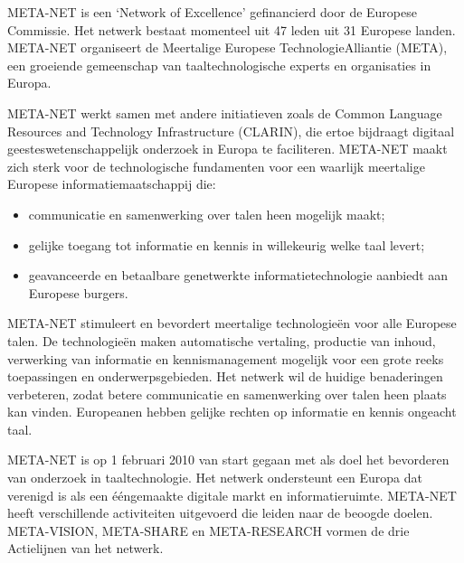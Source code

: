 \documentclass[]{../../metanetpaper}
\begin{document}
\begin{multicols}{2}

    META-NET is een `Network of Excellence' gefinancierd door de Europese Commissie. Het netwerk bestaat momenteel uit 47 leden uit 31 Europese landen. META-NET organiseert de Meertalige Europese TechnologieAlliantie (META), een groeiende gemeenschap van taaltechnologische experts en organisaties in Europa.

    META-NET werkt samen met andere initiatieven zoals de Common Language Resources and Technology Infrastructure (CLARIN), die ertoe bijdraagt digitaal geesteswetenschappelijk onderzoek in Europa te faciliteren. META-NET maakt zich sterk voor de technologische fundamenten voor een waarlijk meertalige Europese informatiemaatschappij die:
    \begin{itemize}
 	\item communicatie en samenwerking over talen heen mogelijk maakt;
 	\item gelijke toegang tot informatie en kennis in willekeurig welke taal levert;
 	\item geavanceerde en betaalbare genetwerkte informatietechnologie aanbiedt aan Europese burgers.
    \end{itemize}

    META-NET stimuleert en bevordert meertalige technologie{\"e}n voor alle Europese talen. De technologie{\"e}n maken automatische vertaling, productie van inhoud, verwerking van informatie en kennismanagement mogelijk voor een grote reeks toepassingen en onderwerpsgebieden. Het netwerk wil de huidige benaderingen verbeteren, zodat betere communicatie en samenwerking over talen heen plaats kan vinden. Europeanen hebben gelijke rechten op informatie en kennis ongeacht taal.

META-NET is op 1 februari 2010 van start gegaan met als doel het bevorderen van onderzoek in taaltechnologie. Het netwerk ondersteunt een Europa dat verenigd is als een {\'e}{\'e}ngemaakte digitale markt en informatieruimte. META-NET heeft verschillende activiteiten uitgevoerd die leiden naar de beoogde doelen. META-VISION, META-SHARE en META-RESEARCH vormen de drie Actielijnen van het netwerk.


\end{multicols}
\end{document}
